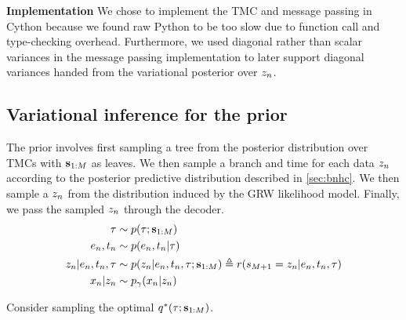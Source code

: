\textbf{Implementation} We chose
to implement the TMC and message
passing in Cython because we found raw Python to be
too slow due to function call and type-checking
overhead. Furthermore, we used diagonal rather than
scalar variances in the message passing implementation
to later support diagonal variances handed 
from the variational posterior over $z_n$.

\subsection{Variational inference for the \acronym\;prior}
\label{sec:inference-details}

The \acronym\; prior involves first sampling a tree
from the posterior distribution over TMCs
with $\mathbf{s}_{1:M}$ as leaves.
We then sample a branch and time
for each data $z_n$ according
to the posterior predictive
distribution described in \autoref{sec:bnhc}.
We then sample a $z_n$ from
the distribution induced by the GRW likelihood model.
Finally, we pass the sampled $z_n$
through the decoder.
\begin{equation}
    \begin{split}
        \tau &\sim p(\tau ; \mathbf{s}_{1:M}) \\
        e_n, t_n &\sim p(e_n, t_n | \tau) \\
        z_n | e_n, t_n, \tau &\sim p(z_n | e_n, t_n, \tau; \mathbf{s}_{1:M}) \triangleq r(s_{M + 1} = z_n | e_n, t_n, \tau) \\
        x_n | z_n &\sim p_\gamma(x_n | z_n)
    \end{split}
\end{equation}

Consider sampling the optimal $q^*(\tau; \mathbf{s}_{1:M})$.

